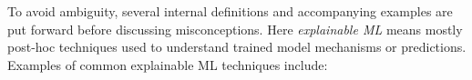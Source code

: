 \documentclass[fleqn]{article}
\begin{document}


To avoid ambiguity, several internal definitions and accompanying examples are put forward before discussing misconceptions. Here \textit{explainable ML} means mostly post-hoc techniques used to understand trained model mechanisms or predictions. Examples of common explainable ML techniques include:
\end{document}

